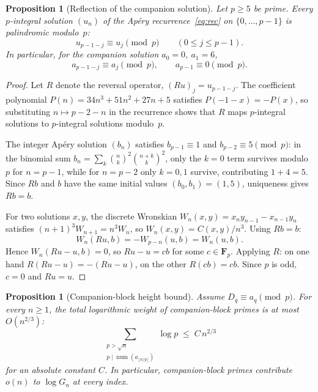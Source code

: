 \documentclass[11pt]{article}
\newtheorem{proposition}[theorem]{Proposition}
\theoremstyle{definition}
\theoremstyle{remark}
\begin{document}
\begin{proposition}[Reflection of the companion solution]
\label{prop:reflection}
Let $p \ge 5$ be prime.  Every $p$-integral solution $(u_n)$
of the Ap\'ery recurrence~\eqref{eq:rec}
on $\{0, \ldots, p-1\}$ is palindromic modulo~$p$:
\[
  u_{p-1-j} \equiv u_j \pmod{p}
  \qquad (0 \le j \le p-1).
\]
In particular, for the companion solution
$a_0 = 0$, $a_1 = 6$,
\[
  a_{p-1-j} \equiv a_j \pmod{p},
  \qquad
  a_{p-1} \equiv 0 \pmod{p}.
\]
\end{proposition}

\begin{proof}
Let $R$ denote the reversal operator,
$(Ru)_j = u_{p-1-j}$.  The coefficient polynomial
$P(n) = 34n^3 + 51n^2 + 27n + 5$ satisfies
$P(-1-x) = -P(x)$,
so substituting $n \mapsto p-2-n$ in the
recurrence shows that $R$ maps $p$-integral
solutions to $p$-integral solutions modulo~$p$.

The integer Ap\'ery solution $(b_n)$ satisfies
$b_{p-1} \equiv 1$ and $b_{p-2} \equiv 5 \pmod{p}$:
in the binomial sum $b_n = \sum_k \binom{n}{k}^2
\binom{n+k}{k}^2$, only the $k = 0$ term survives
modulo~$p$ for $n = p-1$, while for $n = p-2$ only
$k = 0, 1$ survive, contributing $1 + 4 = 5$.
Since $Rb$ and $b$ have the same initial values
$(b_0, b_1) = (1, 5)$, uniqueness gives $Rb = b$.

For two solutions $x, y$, the discrete Wronskian
$W_n(x, y) = x_n y_{n-1} - x_{n-1} y_n$ satisfies
$(n+1)^3 W_{n+1} = n^3 W_n$,
so $W_n(x, y) = C(x,y)/n^3$.
Using $Rb = b$:
\[
  W_n(Ru, b) = -W_{p-n}(u, b) = W_n(u, b).
\]
Hence $W_n(Ru - u, b) = 0$, so $Ru - u = cb$
for some $c \in \mathbf{F}_p$.
Applying $R$: on one hand $R(Ru - u) = -(Ru - u)$,
on the other $R(cb) = cb$.  Since $p$ is odd, $c = 0$
and $Ru = u$.
\end{proof}

\begin{proposition}[Companion-block height bound]
\label{prop:companion-height}
Assume $D_q \equiv a_q \pmod{p}$.
For every $n \ge 1$, the total logarithmic weight of
companion-block primes is at most $O(n^{2/3})$:
\[
  \sum_{\substack{p > \sqrt{n} \\
    p \mid \operatorname{num}(a_{\lfloor n/p \rfloor})}}
  \log p \;\le\; C \, n^{2/3}
\]
for an absolute constant $C$.
In particular, companion-block primes contribute
$o(n)$ to $\log G_n$ at every index.
\end{proposition}
\end{document}
